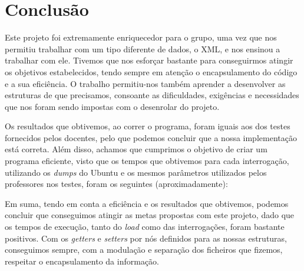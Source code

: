 \documentclass[a4paper, 11pt, oneside]{article}
\begin{document}
\section{Conclusão}

Este projeto foi extremamente enriquecedor para o grupo, uma vez que nos permitiu trabalhar com um tipo diferente de dados, o XML, e nos ensinou a trabalhar com ele. 
Tivemos que nos esforçar bastante para conseguirmos atingir os objetivos estabelecidos, tendo sempre em atenção o encapsulamento do código e a sua eficiência. O trabalho 
permitiu-nos também aprender a desenvolver as estruturas de que precisamos, consoante as dificuldades, exigências e necessidades que nos foram sendo impostas com o 
desenrolar do projeto.

Os resultados que obtivemos, ao correr o programa, foram iguais aos dos testes fornecidos pelos docentes, pelo que podemos concluir que a nossa implementação está correta. 
Além disso, achamos que cumprimos o objetivo de criar um programa eficiente, visto que os tempos que obtivemos para cada interrogação, utilizando os \textit{dumps} do 
Ubuntu e os mesmos parâmetros utilizados pelos professores nos testes, foram os seguintes (aproximadamente):


Em suma, tendo em conta a eficiência e os resultados que obtivemos, podemos concluir que conseguimos atingir as metas propostas com este projeto, dado que os tempos de 
execução, tanto do \textit{load} como das interrogações, foram bastante positivos. Com os \textit{getters} e \textit{setters} por nós definidos para as nossas estruturas, 
conseguimos sempre, com a modulação e separação dos ficheiros que fizemos, respeitar o encapsulamento da informação.
\end{document}
